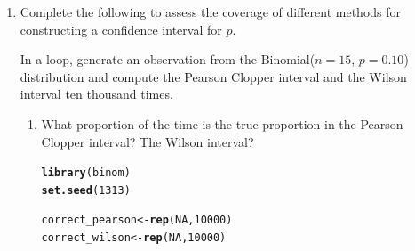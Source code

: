 \documentclass{article}\usepackage[]{graphicx}\usepackage[]{xcolor}
\makeatletter
\newcommand{\hlnum}[1]{\textcolor[rgb]{0.686,0.059,0.569}{#1}}%
\newcommand{\hlopt}[1]{\textcolor[rgb]{0,0,0}{#1}}%
\newcommand{\hldef}[1]{\textcolor[rgb]{0.345,0.345,0.345}{#1}}%
\newcommand{\hlkwb}[1]{\textcolor[rgb]{0.69,0.353,0.396}{#1}}%
\newcommand{\hlkwd}[1]{\textcolor[rgb]{0.737,0.353,0.396}{\textbf{#1}}}%
\newenvironment{kframe}{%
 \def\at@end@of@kframe{}%
 \ifinner\ifhmode%
  \def\at@end@of@kframe{\end{minipage}}%
  \begin{minipage}{\columnwidth}%
 \fi\fi%
 \def\FrameCommand##1{\hskip\@totalleftmargin \hskip-\fboxsep
 \colorbox{shadecolor}{##1}\hskip-\fboxsep
     \hskip-\linewidth \hskip-\@totalleftmargin \hskip\columnwidth}%
 \MakeFramed {\advance\hsize-\width
   \@totalleftmargin\z@ \linewidth\hsize
   \@setminipage}}%
 {\par\unskip\endMakeFramed%
 \at@end@of@kframe}
\newenvironment{knitrout}{}{} %
\makeatother
\begin{document}
\begin{enumerate}
\begin{knitrout}
\begin{kframe}
\begin{alltt}
\hldef{(p_outside} \hlkwb{=} \hlnum{1} \hlopt{-} \hldef{p_between)}
\end{alltt}
\begin{verbatim}
## [1] 0.0251
\end{verbatim}
\end{kframe}
\end{knitrout}

\textcolor{red}{Given that $\bar{X}$ is actually normally distributed:} 
\begin{enumerate}
\item \textcolor{red}{the probability of making an observation outside of the 2.5th and 97.5th percentile when $\lambda$ = 2 is 0.0458.}
\item \textcolor{red}{the probability of making an observation between the 2.5th percentile and 97.5th percentile given $\lambda$ = 2.3 is 0.9749.}
\item \textcolor{red}{the probability of making an observation outside of the 2.5th percentile and 97.5th percentile given $\lambda$ = 2.3 is 0.0251.}
\end{enumerate}

  \item Complete the following to assess the coverage of 
  different methods for constructing a confidence interval for $p$. 
  
  In a loop, generate an observation from the Binomial($n=15$, $p=0.10$) 
  distribution and compute the Pearson Clopper interval and the Wilson interval
  ten thousand times.
  \begin{enumerate}
    \item What proportion of the time is the true proportion in the Pearson 
    Clopper interval? The Wilson interval?
    
\begin{knitrout}
\color{fgcolor}\begin{kframe}
\begin{alltt}
\hlkwd{library}\hldef{(binom)}
\hlkwd{set.seed}\hldef{(}\hlnum{1313}\hldef{)}

\hldef{correct_pearson} \hlkwb{<-} \hlkwd{rep}\hldef{(}\hlnum{NA}\hldef{,} \hlnum{10000}\hldef{)}
\hldef{correct_wilson} \hlkwb{<-} \hlkwd{rep}\hldef{(}\hlnum{NA}\hldef{,} \hlnum{10000}\hldef{)}


\end{alltt}
\end{kframe}
\end{knitrout}
\end{enumerate}
\end{enumerate}
\end{document}
